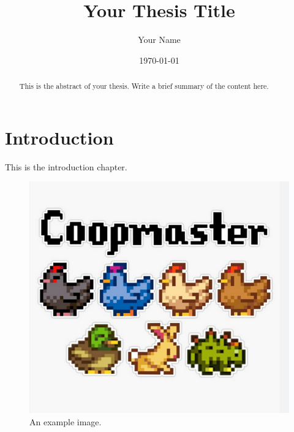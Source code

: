 \documentclass{article}
\begin{document}
    \title{Your Thesis Title}
    \author{Your Name}
    \date{\today}
    \maketitle

    \begin{abstract}
        This is the abstract of your thesis. Write a brief summary of the content here.
    \end{abstract}

    \tableofcontents

    \printindex


    \chapter{Introduction}
    \label{chap:introduction}
    This is the introduction chapter.

    \begin{figure}[h!]
        \centering
        \includegraphics{./images/coopmaster}
        \caption{An example image.}
        \label{fig:example}
    \end{figure}
\end{document}
